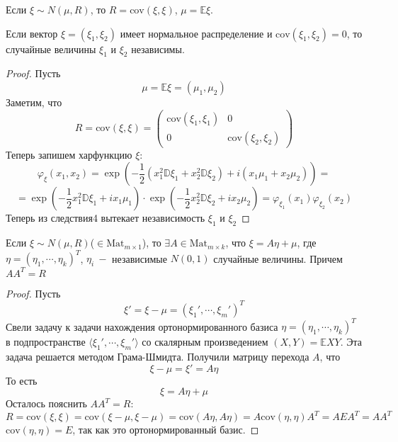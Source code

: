 \begin{corollary}
Если $\xi \sim N\left(\mu, R\right)$, то $R = \text{cov}\left(\xi, \xi\right)$, $\mu = \mathbb{E} \xi$.
\end{corollary}

\begin{corollary}
Если вектор $\xi = \left(\xi_1, \xi_2\right)$ имеет нормальное распределение и $\text{cov}\left(\xi_1, \xi_2\right) = 0$, то случайные величины $\xi_1$ и $\xi_2$ независимы.
\end{corollary}

\begin{proof}
Пусть 
\[
    \mu = \mathbb{E} \xi = \left(\mu_1, \mu_2\right)
\]
Заметим, что 
\[R = 
    \text{cov} \left(\xi, \xi\right)   = 
    \begin{pmatrix}
    \text{cov}\left(\xi_1, \xi_1\right) & 0\\
    0 & \text{cov}\left(\xi_2, \xi_2\right)
    \end{pmatrix}
\]
Теперь запишем харфункцию $\xi$:
\[
    \varphi_{\xi}\left(x_1, x_2\right) = \exp\left(-\frac 1 2 \left(x_1 ^ 2 \mathbb{D} \xi_1 + x_2 ^ 2 \mathbb{D} \xi_2 \right) + i \left(x_1 \mu_1 + x_2 \mu_2\right)\right) =
\]
\[
    = \exp\left(-\frac 1 2 x_1 ^ 2 \mathbb{D} \xi_1 + ix_1 \mu_1\right) \cdot \exp\left(-\frac 1 2 x_2 ^ 2 \mathbb{D} \xi_2 + ix_2 \mu_2\right)= \varphi_{\xi_1}\left(x_1\right) \varphi_{\xi_2}\left(x_2 \right)
\]
Теперь из следствия4 вытекает независимость $\xi_1$ и $\xi_2$
\end{proof}

\begin{corollary}
Если $\xi \sim N\left(\mu, R\right)$($\in \text{Mat}_{m \times 1}$), то $\exists A \in \text{Mat}_{m \times k}$, что $\xi = A \eta + \mu$, где $\eta = \left(\eta_1, \cdots , \eta_k\right) ^ T$, $\eta_i \ -$ независимые $N\left(0, 1\right)$ случайные величины. Причем $A A ^ T = R$
\end{corollary}
\begin{proof}
Пусть \[
    \xi' = \xi - \mu = \left(\xi_1', \cdots, \xi_m'\right)^ T
\]
Свели задачу к задачи нахождения ортонормированного базиса $\eta = \left(\eta_1, \cdots, \eta_k\right) ^ T$ в подпространстве $\langle \xi_1', \cdots, \xi_m' \rangle$ со скалярным произведением $\left(X, Y\right) = \mathbb{E} XY$. Эта задача решается методом Грама-Шмидта. Получили матрицу перехода $A$, что 
\[
    \xi - \mu = \xi' = A \eta
\]
То есть 
\[
    \xi = A \eta + \mu
\]
Осталось пояснить $A A ^ T = R$:
\[
    R = \text{cov} \left(\xi, \xi\right) = \text{cov} \left(\xi - \mu, \xi - \mu\right) = \text{cov} \left(A \eta, A \eta\right) = A \text{cov}\left(\eta, \eta\right) A^ T= A E A ^ T = A A^T
\]
$\text{cov}\left(\eta, \eta\right) = E$, так как это ортонормированный базис.
\end{proof}

